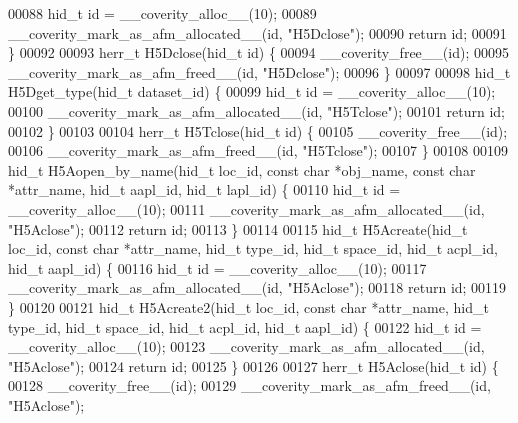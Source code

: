 \begin{DoxyCode}
00088     hid\_t \textcolor{keywordtype}{id} = \_\_coverity\_alloc\_\_(10);
00089     \_\_coverity\_mark\_as\_afm\_allocated\_\_(\textcolor{keywordtype}{id}, \textcolor{stringliteral}{"H5Dclose"});
00090     \textcolor{keywordflow}{return} id;
00091 \}
00092 
00093 herr\_t H5Dclose(hid\_t \textcolor{keywordtype}{id}) \{
00094     \_\_coverity\_free\_\_(\textcolor{keywordtype}{id});
00095     \_\_coverity\_mark\_as\_afm\_freed\_\_(\textcolor{keywordtype}{id}, \textcolor{stringliteral}{"H5Dclose"});
00096 \}
00097 
00098 hid\_t H5Dget\_type(hid\_t dataset\_id) \{
00099     hid\_t \textcolor{keywordtype}{id} = \_\_coverity\_alloc\_\_(10);
00100     \_\_coverity\_mark\_as\_afm\_allocated\_\_(\textcolor{keywordtype}{id}, \textcolor{stringliteral}{"H5Tclose"});
00101     \textcolor{keywordflow}{return} id;
00102 \}
00103 
00104 herr\_t H5Tclose(hid\_t \textcolor{keywordtype}{id}) \{
00105     \_\_coverity\_free\_\_(\textcolor{keywordtype}{id});
00106     \_\_coverity\_mark\_as\_afm\_freed\_\_(\textcolor{keywordtype}{id}, \textcolor{stringliteral}{"H5Tclose"});
00107 \}
00108 
00109 hid\_t H5Aopen\_by\_name(hid\_t loc\_id, \textcolor{keyword}{const} \textcolor{keywordtype}{char} *obj\_name, \textcolor{keyword}{const} \textcolor{keywordtype}{char} *attr\_name, hid\_t aapl\_id, hid\_t 
      lapl\_id) \{
00110     hid\_t \textcolor{keywordtype}{id} = \_\_coverity\_alloc\_\_(10);
00111     \_\_coverity\_mark\_as\_afm\_allocated\_\_(\textcolor{keywordtype}{id}, \textcolor{stringliteral}{"H5Aclose"});
00112     \textcolor{keywordflow}{return} id;
00113 \}
00114 
00115 hid\_t H5Acreate(hid\_t loc\_id, \textcolor{keyword}{const} \textcolor{keywordtype}{char} *attr\_name, hid\_t type\_id, hid\_t space\_id, hid\_t acpl\_id, hid\_t 
      aapl\_id) \{
00116     hid\_t \textcolor{keywordtype}{id} = \_\_coverity\_alloc\_\_(10);
00117     \_\_coverity\_mark\_as\_afm\_allocated\_\_(\textcolor{keywordtype}{id}, \textcolor{stringliteral}{"H5Aclose"});
00118     \textcolor{keywordflow}{return} id;
00119 \}
00120 
00121 hid\_t H5Acreate2(hid\_t loc\_id, \textcolor{keyword}{const} \textcolor{keywordtype}{char} *attr\_name, hid\_t type\_id, hid\_t space\_id, hid\_t acpl\_id, hid\_t 
      aapl\_id) \{
00122     hid\_t \textcolor{keywordtype}{id} = \_\_coverity\_alloc\_\_(10);
00123     \_\_coverity\_mark\_as\_afm\_allocated\_\_(\textcolor{keywordtype}{id}, \textcolor{stringliteral}{"H5Aclose"});
00124     \textcolor{keywordflow}{return} id;
00125 \}
00126 
00127 herr\_t H5Aclose(hid\_t \textcolor{keywordtype}{id}) \{
00128     \_\_coverity\_free\_\_(\textcolor{keywordtype}{id});
00129     \_\_coverity\_mark\_as\_afm\_freed\_\_(\textcolor{keywordtype}{id}, \textcolor{stringliteral}{"H5Aclose"});

\end{DoxyCode}
